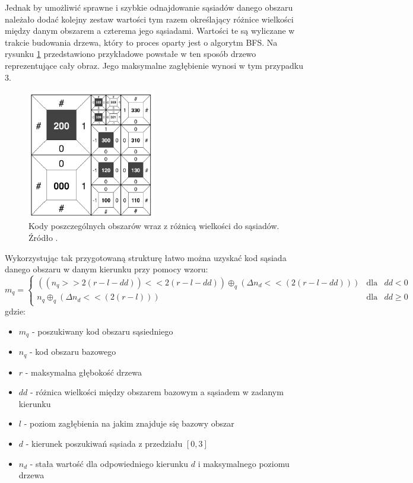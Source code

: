 \documentclass{classrep}
\begin{document}
Jednak by umożliwić sprawne i szybkie odnajdowanie sąsiadów danego obszaru należało dodać kolejny zestaw wartości tym razem określający różnice wielkości między danym obszarem a czterema jego sąsiadami. Wartości te są wyliczane w trakcie budowania drzewa, który to proces oparty jest o algorytm BFS. Na rysunku \ref{fig_seg_kody2} przedstawiono przykładowe powstałe w ten sposób drzewo reprezentujące cały obraz. Jego maksymalne zagłębienie wynosi w tym przypadku 3.

\begin{figure}[H]
  \centering
  \includegraphics[width=0.5\textwidth]{img/seg/kody2}
  \caption{Kody poszczególnych obszarów wraz z różnicą wielkości do sąsiadów. Źródło \cite{3}.}
  \label{fig_seg_kody2}
\end{figure}

Wykorzystując tak przygotowaną strukturę łatwo można uzyskać kod sąsiada danego obszaru w danym kierunku przy pomocy wzoru:
\begin{equation}
\label{eq:seg_nei}
m_{q}=\left\{
\begin{array}{lcc}
((n_{q}>>2(r-l-dd))<<2(r-l-dd))\oplus_{q}(\Delta n_{d}<<(2(r-l-dd)))&\mbox{dla}&dd<0\\
n_{q}\oplus_{q}(\Delta n_{d}<<(2(r-l)))&\mbox{dla}&dd\ge 0
\end{array}
\right.
\end{equation}
gdzie:
\begin{itemize}
\item $m_{q}$ - poszukiwany kod obszaru sąsiedniego
\item $n_{q}$ - kod obszaru bazowego
\item $r$ - maksymalna głębokość drzewa
\item $dd$ - różnica wielkości między obszarem bazowym a sąsiadem w zadanym kierunku
\item $l$ - poziom zagłębienia na jakim znajduje się bazowy obszar
\item $d$ - kierunek poszukiwań sąsiada z przedziału $[0,3]$
\item $n_{d}$ - stała wartość dla odpowiedniego kierunku $d$ i maksymalnego poziomu drzewa
\end{itemize}
\end{document}
